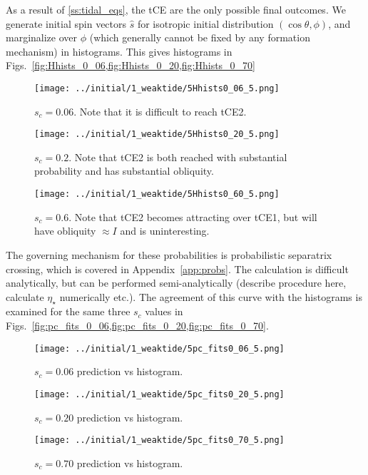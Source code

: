 \documentclass[
        fleqn,
        usenatbib,
        referee,
    ]{mnras}
\newcommand*{\p}[1]{\left(#1\right)}
\begin{document}
As a result of \autoref{ss:tidal_eqs}, the tCE are the only possible final
outcomes. We generate initial spin vectors $\hat{s}$ for isotropic initial
distribution $\p{\cos \theta, \phi}$, and marginalize over $\phi$ (which
generally cannot be fixed by any formation mechanism) in histograms. This gives
histograms in Figs.~\ref{fig:Hhists_0_06,fig:Hhists_0_20,fig:Hhists_0_70}
\begin{figure}
    \centering
    \texttt{[image: ../initial/1\_weaktide/5Hhists0\_06\_5.png]}
    \caption{$s_c = 0.06$. Note that it is difficult to reach
    tCE2.}\label{fig:Hhists_0_06}
\end{figure}
\begin{figure}
    \centering
    \texttt{[image: ../initial/1\_weaktide/5Hhists0\_20\_5.png]}
    \caption{$s_c = 0.2$. Note that tCE2 is both reached with substantial
    probability and has substantial obliquity.}\label{fig:Hhists_0_20}
\end{figure}
\begin{figure}
    \centering
    \texttt{[image: ../initial/1\_weaktide/5Hhists0\_60\_5.png]}
    \caption{$s_c = 0.6$. Note that tCE2 becomes attracting over tCE1, but will
    have obliquity $\approx I$ and is uninteresting.}\label{fig:Hhists_0_70}
\end{figure}

The governing mechanism for these probabilities is probabilistic separatrix
crossing, which is covered in Appendix~\ref{app:probs}. The calculation is
difficult analytically, but can be performed semi-analytically (describe
procedure here, calculate $\eta_{\star}$ numerically etc.). The agreement of
this curve with the histograms is examined for the same three $s_c$ values
in Figs.~\ref{fig:pc_fits_0_06,fig:pc_fits_0_20,fig:pc_fits_0_70}.
\begin{figure}
    \centering
    \texttt{[image: ../initial/1\_weaktide/5pc\_fits0\_06\_5.png]}
    \caption{$s_c = 0.06$ prediction vs histogram.}\label{fig:pc_fits_0_06}
\end{figure}
\begin{figure}
    \centering
    \texttt{[image: ../initial/1\_weaktide/5pc\_fits0\_20\_5.png]}
    \caption{$s_c = 0.20$ prediction vs histogram.}\label{fig:pc_fits_0_20}
\end{figure}
\begin{figure}
    \centering
    \texttt{[image: ../initial/1\_weaktide/5pc\_fits0\_70\_5.png]}
    \caption{$s_c = 0.70$ prediction vs histogram.}\label{fig:pc_fits_0_70}
\end{figure}
\end{document}
